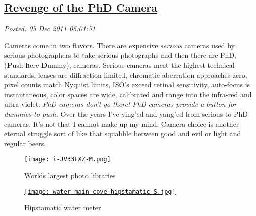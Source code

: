 %

\subsection*{\href{https://bakerjd99.wordpress.com/2011/12/04/revenge-of-the-phd-camera/}{Revenge of the PhD Camera}}


\noindent\emph{Posted: 05 Dec 2011 05:01:51}
\vspace{6pt}

Cameras come in two flavors. There are expensive \emph{serious} cameras
used by serious photographers to take serious photographs and then there
are PhD, (\textbf{P}ush \textbf{h}ere \textbf{D}ummy), cameras. Serious
cameras meet the highest technical standards, lenses are diffraction
limited, chromatic aberration approaches zero, pixel counts match
\href{http://www.normankoren.com/Tutorials/MTF2.html}{Nyquist limits},
ISO's exceed retinal sensitivity, auto-focus is instantaneous, color
spaces are wide, calibrated and range into the infra-red and
ultra-violet. \emph{PhD cameras don't go there! PhD cameras provide a
button for dummies to push.} Over the years I've ying'ed and yang'ed
from serious to PhD cameras. It's not that I cannot make up my mind.
Camera choice is another eternal struggle sort of like that squabble
between good and evil or light and regular beers.


\captionsetup[figure]{labelformat=empty}
\begin{figure}[ht]
\begin{minipage}[b]{0.50\textwidth}
\centering
\href{http://1000memories.com/blog/94-number-of-photos-ever-taken-digital-and-analog-in-shoebox}{\texttt{[image: i-JV33FXZ-M.png]}}
\caption{Worlds largest photo libraries}
\label{fig:2215X1}
\end{minipage}
\begin{minipage}[b]{0.50\textwidth}
\centering
\href{http://conceptcontrol.smugmug.com/Themes/Diaries/Cell-Phoning-It-In/17756793\_PfCsJz}{\texttt{[image: water-main-cove-hipstamatic-S.jpg]}}
\caption{Hipstamatic water  meter}
\label{fig:2215X0}
\end{minipage}
\end{figure}



